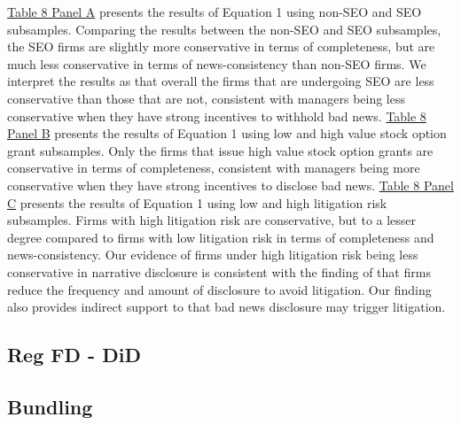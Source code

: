 \documentclass[letterpaper,11pt]{article}
\begin{document}
\begin{spacing}{1.5}
\hyperref[T8]{Table 8 Panel A} presents the results of Equation 1 using non-SEO and SEO subsamples. Comparing the results between the non-SEO and SEO subsamples, the SEO firms are slightly more conservative in terms of completeness, but are much less conservative in terms of news-consistency than non-SEO firms. We interpret the results as that overall the firms that are undergoing SEO are less conservative than those that are not, consistent with managers being less conservative when they have strong incentives to withhold bad news. \hyperref[T8]{Table 8 Panel B} presents the results of Equation 1 using low and high value stock option grant subsamples. Only the firms that issue high value stock option grants are conservative in terms of completeness, consistent with managers being more conservative when they have strong incentives to disclose bad news. \hyperref[T8]{Table 8 Panel C} presents the results of Equation 1 using low and high litigation risk subsamples. Firms with high litigation risk are conservative, but to a lesser degree compared to firms with low litigation risk in terms of completeness and news-consistency. Our evidence of firms under high litigation risk being less conservative in narrative disclosure is consistent with the finding of  that firms reduce the frequency and amount of disclosure to avoid litigation. Our finding also provides indirect support to  that bad news disclosure may trigger litigation.

\subsection{Reg FD - DiD}

\subsection{Bundling}


\end{spacing}
\end{document}
